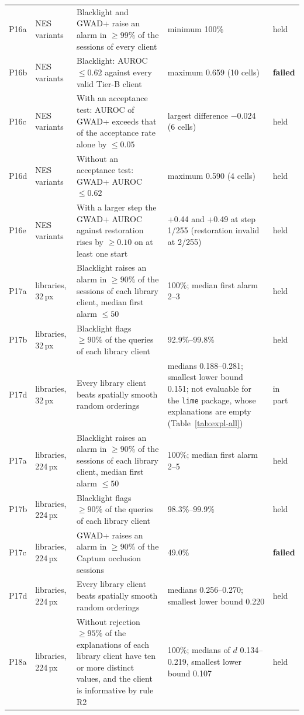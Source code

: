 \begin{footnotesize}
\begin{longtable}{L{0.9cm}L{1.9cm}L{5.0cm}L{3.4cm}L{1.1cm}}
P16a & NES variants & Blacklight and GWAD+ raise an alarm in $\ge99\%$ of the sessions of every client & minimum 100\% & held \\
P16b & NES variants & Blacklight: AUROC $\le0.62$ against every valid Tier-B client & maximum 0.659 (10 cells) & \textbf{failed} \\
P16c & NES variants & With an acceptance test: AUROC of GWAD+ exceeds that of the acceptance rate alone by $\le0.05$ & largest difference $-$0.024 (6 cells) & held \\
P16d & NES variants & Without an acceptance test: GWAD+ AUROC $\le0.62$ & maximum 0.590 (4 cells) & held \\
P16e & NES variants & With a larger step the GWAD+ AUROC against restoration rises by $\ge0.10$ on at least one start & +0.44 and +0.49 at step 1/255 (restoration invalid at 2/255) & held \\
P17a & libraries, 32\,px & Blacklight raises an alarm in $\ge90\%$ of the sessions of each library client, median first alarm $\le50$ & 100\%; median first alarm 2--3 & held \\
P17b & libraries, 32\,px & Blacklight flags $\ge90\%$ of the queries of each library client & 92.9\%--99.8\% & held \\
P17d & libraries, 32\,px & Every library client beats spatially smooth random orderings & medians 0.188--0.281; smallest lower bound 0.151; not evaluable for the \texttt{lime} package, whose explanations are empty (Table~\ref{tab:expl-all}) & in part \\
P17a & libraries, 224\,px & Blacklight raises an alarm in $\ge90\%$ of the sessions of each library client, median first alarm $\le50$ & 100\%; median first alarm 2--5 & held \\
P17b & libraries, 224\,px & Blacklight flags $\ge90\%$ of the queries of each library client & 98.3\%--99.9\% & held \\
P17c & libraries, 224\,px & GWAD+ raises an alarm in $\ge90\%$ of the Captum occlusion sessions & 49.0\% & \textbf{failed} \\
P17d & libraries, 224\,px & Every library client beats spatially smooth random orderings & medians 0.256--0.270; smallest lower bound 0.220 & held \\
P18a & libraries, 224\,px & Without rejection $\ge95\%$ of the explanations of each library client have ten or more distinct values, and the client is informative by rule R2 & 100\%; medians of $d$ 0.134--0.219, smallest lower bound 0.107 & held \\

\end{longtable}
\end{footnotesize}
